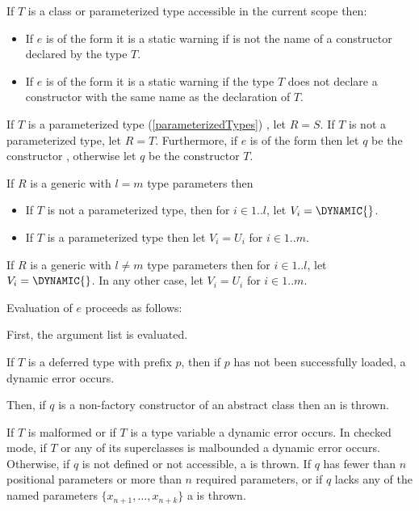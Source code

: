 \documentclass{article}
\begin{document}
\LMHash{}
If $T$ is a class or parameterized type accessible in the current scope then:
\begin{itemize}
\item
If $e$ is of the form
it is a static warning if  is not the name of a constructor declared by the type $T$.
\item
If $e$ is of the form
it is a static warning if the type $T$ does not declare a constructor with the same name as the declaration of $T$.
\end{itemize}

\LMHash{}
If $T$ is a parameterized type (\ref{parameterizedTypes})
,
let $R = S$.
If $T$ is not a parameterized type, let $R = T$.
Furthermore, if $e$ is of the form
then let $q$ be the constructor , otherwise let $q$ be the constructor $T$.

\LMHash{}
If $R$ is a generic with $l = m$ type parameters then
\begin{itemize}
\item If $T$ is not a parameterized type, then for $ i \in 1 .. l$, let $V_i = \DYNAMIC{}$.
\item If $T$ is a parameterized type then let $V_i = U_i$ for $ i \in 1 .. m$.
\end{itemize}

\LMHash{}
If $R$ is a generic with $l \ne m$ type parameters then for $ i \in 1 .. l$, let $V_i = \DYNAMIC{}$.
In any other case, let $V_i = U_i$ for $ i \in 1 .. m$.

\LMHash{}
Evaluation of $e$ proceeds as follows:

\LMHash{}
First, the argument list
is evaluated.

\LMHash{}
If $T$ is a deferred type with prefix $p$, then if $p$ has not been successfully loaded, a dynamic error occurs.

\LMHash{}
Then, if $q$ is a non-factory constructor of an abstract class then an  is thrown.

\LMHash{}
If $T$ is malformed or if $T$ is a type variable a dynamic error occurs.
In checked mode, if $T$ or any of its superclasses is malbounded a dynamic error occurs.
Otherwise, if $q$ is not defined or not accessible, a  is thrown.
If $q$ has fewer than $n$ positional parameters or more than $n$ required parameters,
or if $q$ lacks any of the named parameters $\{ x_{n+1}, \ldots, x_{n+k}\}$ a  is thrown.
\end{document}
